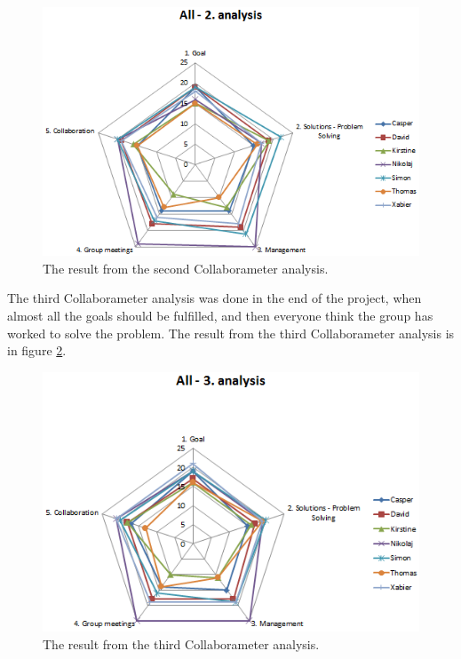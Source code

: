 \begin{figure}[h]
\centering
\includegraphics[width=0.6\linewidth]{./graphics/2analysisCollaborameter}
\caption{The result from the second Collaborameter analysis.}
\label{fig:2analysisCollaborameter}
\end{figure}

The third Collaborameter analysis was done in the end of the project, when almost all the goals should be fulfilled, and then everyone think the group has worked to solve the problem. The result from the third Collaborameter analysis is in figure \ref{fig:3analysisCollaborameter}.

\begin{figure}
\centering
\includegraphics[width=0.6\linewidth]{./graphics/3analysisCollaborameter}
\caption{The result from the third Collaborameter analysis.}
\label{fig:3analysisCollaborameter}
\end{figure}

